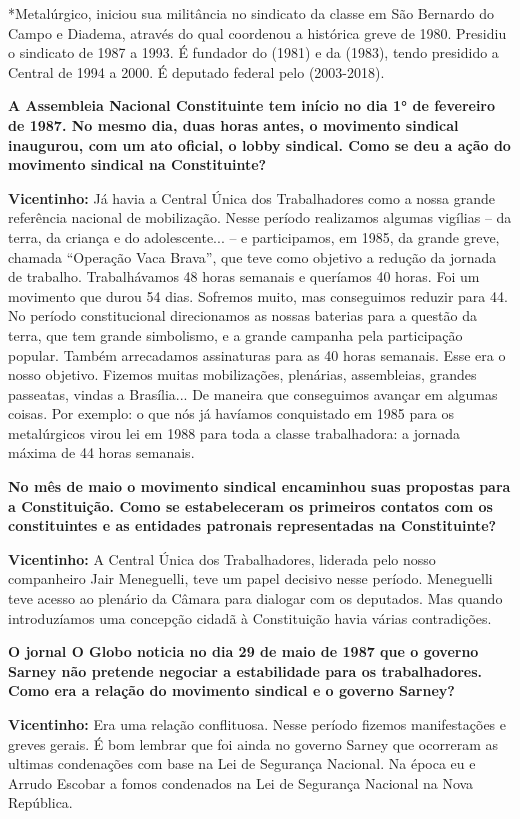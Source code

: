 *​Metalúrgico, iniciou sua militância no sindicato da classe em São
Bernardo do Campo e Diadema, através do qual coordenou a histórica greve
de 1980. Presidiu o sindicato de 1987 a 1993. É fundador do  (1981) e
da  (1983), tendo presidido a Central de 1994 a 2000. É deputado
federal pelo  (2003-2018).

\textbf{A Assembleia Nacional Constituinte tem início no dia 1° de
fevereiro de 1987. No mesmo dia, duas horas antes, o movimento sindical
inaugurou, com um ato oficial, o lobby sindical. Como se deu a ação do
movimento sindical na Constituinte?}

\textbf{Vicentinho:} Já havia a Central Única dos Trabalhadores como a
nossa grande referência nacional de mobilização. Nesse período
realizamos algumas vigílias -- da terra, da criança e do adolescente...
-- e participamos, em 1985, da grande greve, chamada ``Operação Vaca
Brava'', que teve como objetivo a redução da jornada de trabalho.
Trabalhávamos 48 horas semanais e queríamos 40 horas. Foi um movimento
que durou 54 dias. Sofremos muito, mas conseguimos reduzir para 44. No
período constitucional direcionamos as nossas baterias para a questão da
terra, que tem grande simbolismo, e a grande campanha pela participação
popular. Também arrecadamos assinaturas para as 40 horas semanais. Esse
era o nosso objetivo. Fizemos muitas mobilizações, plenárias,
assembleias, grandes passeatas, vindas a Brasília... De maneira que
conseguimos avançar em algumas coisas. Por exemplo: o que nós já
havíamos conquistado em 1985 para os metalúrgicos virou lei em 1988 para
toda a classe trabalhadora: a jornada máxima de 44 horas semanais.

\textbf{No mês de maio o movimento sindical encaminhou suas propostas
para a Constituição. Como se estabeleceram os primeiros contatos com os
constituintes e as entidades patronais representadas na Constituinte?}

\textbf{Vicentinho:} A Central Única dos Trabalhadores, liderada pelo
nosso companheiro Jair Meneguelli, teve um papel decisivo nesse período.
Meneguelli teve acesso ao plenário da Câmara para dialogar com os
deputados. Mas quando introduzíamos uma concepção cidadã à Constituição
havia várias contradições.

\textbf{O jornal O Globo noticia no dia 29 de maio de 1987 que o governo
Sarney não pretende negociar a estabilidade para os trabalhadores.}
\textbf{Como era a relação do movimento sindical e o governo Sarney?}

\textbf{Vicentinho:} Era uma relação conflituosa. Nesse período fizemos
manifestações e greves gerais. É bom lembrar que foi ainda no governo
Sarney que ocorreram as ultimas condenações com base na Lei de Segurança
Nacional. Na época eu e Arrudo Escobar a fomos condenados na Lei de
Segurança Nacional na Nova República.

